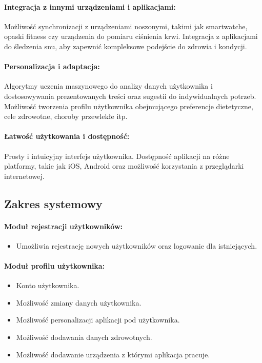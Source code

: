\paragraph{Integracja z innymi urządzeniami i aplikacjami:} Możliwość synchronizacji z urządzeniami noszonymi, takimi jak smartwatche, opaski fitness czy urządzenia do pomiaru ciśnienia krwi. Integracja z aplikacjami do śledzenia snu, aby zapewnić kompleksowe podejście do zdrowia i kondycji.

\paragraph{Personalizacja i adaptacja:} Algorytmy uczenia maszynowego do analizy danych użytkownika i dostosowywania prezentowanych treści oraz sugestii do indywidualnych potrzeb. Możliwość tworzenia profilu użytkownika obejmującego preferencje dietetyczne, cele zdrowotne, choroby przewlekłe itp.

\paragraph{Łatwość użytkowania i dostępność:} Prosty i intuicyjny interfejs użytkownika. Dostępność aplikacji na różne platformy, takie jak iOS, Android oraz możliwość korzystania z przeglądarki internetowej.

\begin{center}
  \subsection{Zakres systemowy}
\end{center}

\paragraph{Moduł rejestracji użytkowników:}
\begin{itemize}
  \item Umożliwia rejestrację nowych użytkowników oraz logowanie dla istniejących.
\end{itemize}

\paragraph{Moduł profilu użytkownika:} 
\begin{itemize}
  \item Konto użytkownika.
  \item Możliwość zmiany danych użytkownika.
  \item Możliwość personalizacji aplikacji pod użytkownika.
  \item Możliwość dodawania danych zdrowotnych.
  \item Możliwość dodawanie urządzenia z którymi aplikacja pracuje.
\end{itemize}

